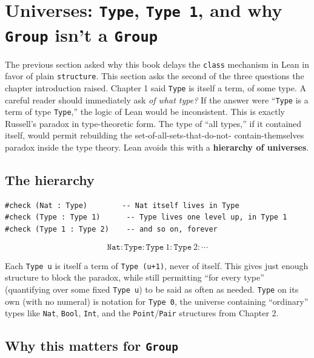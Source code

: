 \section{\texorpdfstring{Universes: \texttt{Type}, \texttt{Type\ 1}, and why \texttt{Group} isn't a \texttt{Group}}{Universes: Type, Type 1, and why Group isn't a Group}}\label{sec:05-rigor-check:02-universes:1}

The previous section asked why this book delays the \texttt{class} mechanism in Lean in favor of plain \texttt{structure}. This section asks the second of the three questions the chapter introduction raised. Chapter 1 said \texttt{Type} is itself a term, of some type. A careful reader should immediately ask \emph{of what type?} If the answer were ``\texttt{Type} is a term of type \texttt{Type},'' the logic of Lean would be inconsistent. This is exactly Russell's paradox in type-theoretic form. The type of ``all types,'' if it contained itself, would permit rebuilding the set-of-all-sets-that-do-not- contain-themselves paradox inside the type theory. Lean avoids this with a \textbf{hierarchy of universes}.

\subsection{The hierarchy}\label{sec:05-rigor-check:02-universes:2}

\begin{lstlisting}
#check (Nat : Type)        -- Nat itself lives in Type
#check (Type : Type 1)      -- Type lives one level up, in Type 1
#check (Type 1 : Type 2)    -- and so on, forever
\end{lstlisting}

\[
\mathtt{Nat} : \mathtt{Type} : \mathtt{Type}\ 1 : \mathtt{Type}\ 2 : \cdots
\]

Each \texttt{Type u} is itself a term of \texttt{Type (u+1)}, never of itself. This gives just enough structure to block the paradox, while still permitting ``for every type'' (quantifying over some fixed \texttt{Type u}) to be said as often as needed. \texttt{Type} on its own (with no numeral) is notation for \texttt{Type 0}, the universe containing ``ordinary'' types like \texttt{Nat}, \texttt{Bool}, \texttt{Int}, and the \texttt{Point}/\texttt{Pair} structures from Chapter 2.

\subsection{\texorpdfstring{Why this matters for \texttt{Group}}{Why this matters for Group}}\label{sec:05-rigor-check:02-universes:3}

